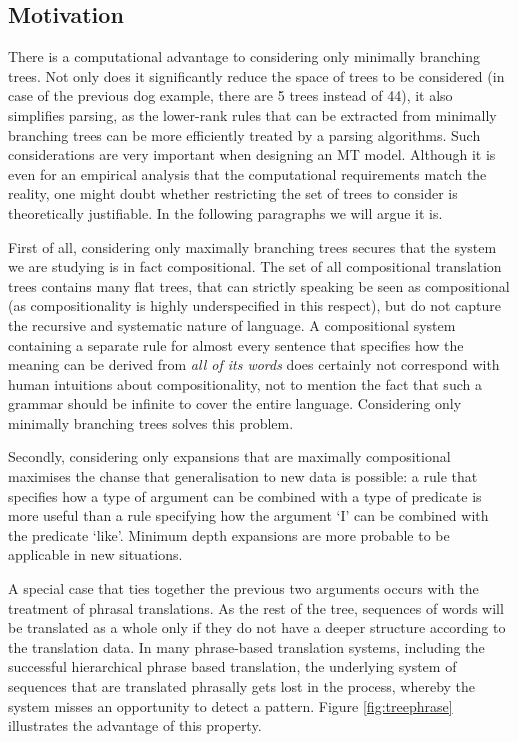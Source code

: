 \documentclass{report}
\begin{document}
\subsection{Motivation}

There is a computational advantage to considering only minimally branching trees. Not only does it significantly reduce the space of trees to be considered (in case of the previous dog example, there are 5 trees instead of 44), it also simplifies parsing, as the lower-rank rules that can be extracted from minimally branching trees can be more efficiently treated by a parsing algorithms. Such considerations are very important when designing an MT model. Although it is even for an empirical analysis that the computational requirements match the reality, one might doubt whether restricting the set of trees to consider is theoretically justifiable. In the following paragraphs we will argue it is.

First of all, considering only maximally branching trees secures that the system we are studying is in fact compositional. The set of all compositional translation trees contains many flat trees, that can strictly speaking be seen as compositional (as compositionality is highly underspecified in this respect), but do not capture the recursive and systematic nature of language. A compositional system containing a separate rule for almost every sentence that specifies how the meaning can be derived from \textit{all of its words} does certainly not correspond with human intuitions about compositionality, not to mention the fact that such a grammar should be infinite to cover the entire language. Considering only minimally branching trees solves this problem.

Secondly, considering only expansions that are maximally compositional maximises the chanse that generalisation to new data is possible: a rule that specifies how a type of argument can be combined with a type of predicate is more useful than a rule specifying how the argument `I' can be combined with the predicate `like'. Minimum depth expansions are more probable to be applicable in new situations.

A special case that ties together the previous two arguments occurs with the treatment of phrasal translations. As the rest of the tree, sequences of words will be translated as a whole only if they do not have a deeper structure according to the translation data. In many phrase-based translation systems, including the successful hierarchical phrase based translation, the underlying system of sequences that are translated phrasally gets lost in the process, whereby the system misses an opportunity to detect a pattern. Figure \ref{fig:treephrase} illustrates the advantage of this property.
\end{document}
